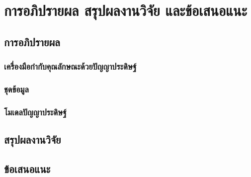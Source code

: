 
\chapter{การอภิปรายผล สรุปผลงานวิจัย และข้อเสนอแนะ}

\section{การอภิปรายผล}
\subsection{เครื่องมือกำกับคุณลักษณะด้วยปัญญาประดิษฐ์}


\subsection{ชุดข้อมูล}

\subsection{โมเดลปัญญาประดิษฐ์}


\section{สรุปผลงานวิจัย}
\section{ข้อเสนอแนะ}
